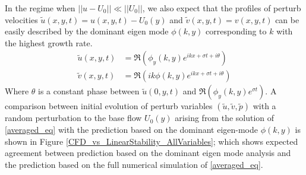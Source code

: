 \documentclass[12pt]{report}   %
\begin{document}
In the regime when $||u-U_0|| \ll ||U_0||$, we also expect that the profiles of perturb velocities $\tilde{u}(x,y,t) = u(x,y,t) - U_0(y)$ and $\tilde{v}(x,y,t) = v(x,y,t)$ can be easily described by the dominant eigen mode $\phi(k,y)$ corresponding to $k$ with the highest growth rate.
\begin{equation}
\begin{split}
 \tilde{u}(x,y,t) &= \Re\left(\phi_y(k,y) e^{ikx+\sigma t+ i\theta}\right)\\
 \tilde{v}(x,y,t) &= \Re\left(ik \phi(k,y) e^{ikx+\sigma t + i\theta }\right)
\end{split}
\end{equation}
Where $\theta$ is a constant phase between $\tilde{u}(0,y,t)$ and $\Re(\phi_y(k,y) e^{\sigma t})$. A comparison between initial evolution of perturb variables $(\tilde{u}, \tilde{v}, \tilde{p})$ with a random perturbation to the base flow $U_0(y)$ arising from the solution of \eqref{averaged_eq} with the prediction based  on the dominant eigen-mode $\phi(k,y)$ is shown in Figure \ref{CFD_vs_LinearStability_AllVariables}; which shows expected agreement between prediction based on the dominant eigen mode analysis and the prediction based on the full numerical simulation of \eqref{averaged_eq}.
\end{document}
